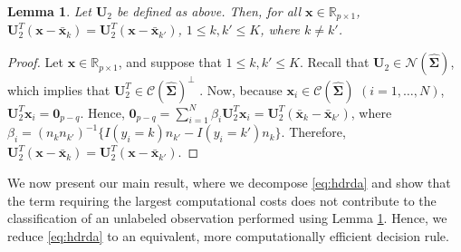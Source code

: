 \documentclass[]{interact}\usepackage[]{graphicx}\usepackage[]{color}
\newcommand{\xbar}{\bar{\bm x}}
\newtheorem{lemma}{Lemma}
\begin{document}
\begin{lemma}\label{lemma:RDA-constant-term}
Let $\bm U_2$ be defined as above. Then, for all $\bm x \in \mathbb{R}_{p \times
  1}$, $\bm U_2^{T} (\bm x - \xbar_k) = \bm U_2^{T} (\bm x - \xbar_{k'})$, $1
\le k, k' \le K$, where $k \ne k'$.
\end{lemma}
\begin{proof}
Let $\bm x \in \mathbb{R}_{p \times 1}$, and suppose that $1 \le k, k' \le K$.
Recall that $\bm U_2 \in \mathcal{N}(\widehat{\bm \Sigma})$, which implies that
$\bm U_2^{T} \in \mathcal{C}(\widehat{\bm \Sigma})^{\perp}$ \citep[Lemma
  1.2.5]{Kollo:2005vp}. Now, because $\bm x_i \in \mathcal{C}(\widehat{ \bm
  \Sigma})$ $(i = 1, \ldots, N)$, $\bm U_2^{T} \bm x_i = \bm 0_{p-q}$.  Hence,
$\bm 0_{p-q} = \sum_{i=1}^N \beta_i \bm U_2^{T}\bm x_i = \bm U_2^{T}(\xbar_k -
\xbar_{k'})$, where $\beta_i = (n_k n_{k'})^{-1} \{ I(y_i = k) n_{k'} - I(y_i =
k') n_k \}$. Therefore, $\bm U_2^{T} (\bm x - \xbar_k) = \bm U_2^{T} (\bm x -
\xbar_{k'})$.
\end{proof}

We now present our main result, where we decompose \eqref{eq:hdrda} and show
that the term requiring the largest computational costs does not contribute to
the classification of an unlabeled observation performed using Lemma
\ref{lemma:RDA-constant-term}. Hence, we reduce \eqref{eq:hdrda} to an
equivalent, more computationally efficient decision rule.
\end{document}
